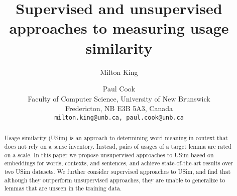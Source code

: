 \documentclass[11pt]{article}
\title{Supervised and unsupervised approaches to measuring usage similarity}
\author{Milton King \and Paul Cook \\
Faculty of Computer Science, University of New Brunswick\\
Fredericton, NB E3B 5A3, Canada\\
\tt{milton.king@unb.ca}, \tt{paul.cook@unb.ca}}
\date{}
\begin{document}
\maketitle

\begin{abstract}
Usage similarity (USim) is an approach to determining word meaning in
context that does not rely on a sense inventory. Instead, pairs of
usages of a target lemma are rated on a scale. In this paper we
propose unsupervised approaches to USim based on embeddings for words,
contexts, and sentences, and achieve state-of-the-art results over two
USim datasets. We further consider supervised approaches to USim, and
find that although they outperform unsupervised approaches, they are
unable to generalize to lemmas that are unseen in the training data.
\end{abstract}






\end{document}
